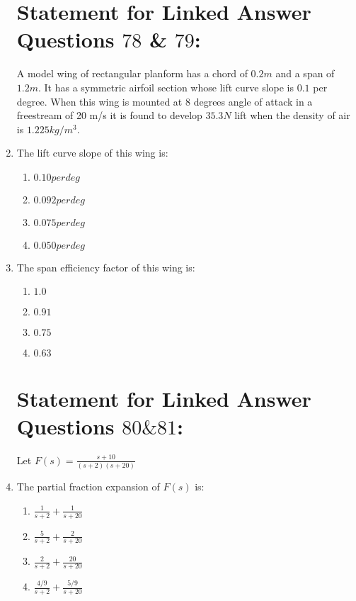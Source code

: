 \documentclass[journal]{IEEEtran}
\begin{document}
\begin{enumerate}
\section*{Statement for Linked Answer Questions $78$ \& $79$:}
A model wing of rectangular planform has a chord of $0.2 m$ and a span of $1.2 m$. It has a symmetric airfoil section whose lift curve slope is $0.1$ per degree. When this wing is mounted at $8$ degrees angle of attack in a freestream of 20 m/s it is found to develop $35.3 N$ lift when the density of air is $1.225 kg/m^3$.\\

\item The lift curve slope of this wing is:
\begin{enumerate}
    \item  $0.10 per deg$
    \item  $0.092 per deg$
    \item  $0.075 per deg$
    \item  $0.050 per deg$\\
\end{enumerate}

\item The span efficiency factor of this wing is:
\begin{enumerate}
    \item  $1.0$
    \item  $0.91$
    \item  $0.75$
    \item  $0.63$\\
\end{enumerate}

\section*{Statement for Linked Answer Questions $80 \& 81$:}
Let $F(s) = \frac{s+10}{(s+2)(s+20)}$\\

\item The partial fraction expansion of $F(s)$ is:
\begin{enumerate}
    \item  $\frac{1}{s+2} + \frac{1}{s+20}$
    \item  $\frac{5}{s+2} + \frac{2}{s+20}$
    \item  $\frac{2}{s+2} + \frac{20}{s+20}$
    \item  $\frac{4/9}{s+2} + \frac{5/9}{s+20}$\\
\end{enumerate}


\end{enumerate}
\end{document}
